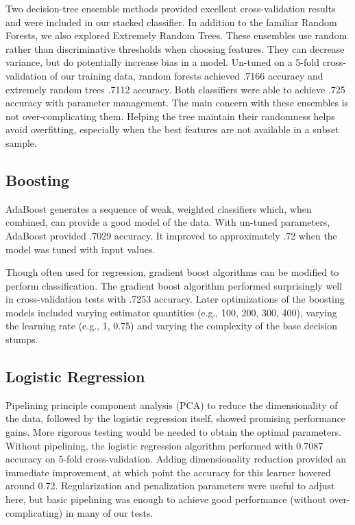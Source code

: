 \documentclass{article}
\begin{document}
Two decision-tree ensemble methods provided excellent cross-validation results and were included in our stacked classifier.
In addition to the familiar Random Forests, we also explored Extremely Random Trees.
These ensembles use random rather than discriminative thresholds when choosing features. 
They can decrease variance, but do potentially increase bias in a model.
Un-tuned on a 5-fold cross-validation of our training data, random forests achieved .7166 accuracy and extremely random trees .7112 accuracy.
Both classifiers were able to achieve .725 accuracy with parameter management. 
The main concern with these ensembles is not over-complicating them.
Helping the tree maintain their randomness helps avoid overfitting, especially when the best features are not available in a subset sample.

\subsection{Boosting}

AdaBoost generates a sequence of weak, weighted classifiers which, when combined, can provide a good model of the data.
With un-tuned parameters, AdaBoost provided .7029 accuracy. It improved to approximately .72 when the model was tuned with input values.

Though often used for regression, gradient boost algorithms can be modified to perform classification.
The gradient boost algorithm performed surprisingly well in cross-validation tests with .7253 accuracy.
Later optimizations of the boosting models included varying estimator quantities (e.g., 100, 200, 300, 400), varying the learning rate (e.g., 1, 0.75) and varying the complexity of the base decision stumps.

\subsection{Logistic Regression}

Pipelining principle component analysis (PCA) to reduce the dimensionality of the data, followed by the logistic regression itself, showed promising performance gains.
More rigorous testing would be needed to obtain the optimal parameters. 
Without pipelining, the logistic regression algorithm performed with 0.7087 accuracy on 5-fold cross-validation.
Adding dimensionality reduction provided an immediate improvement, at which point the accuracy for this learner hovered around 0.72.
Regularization and penalization parameters were useful to adjust here, but basic pipelining was enough to achieve good performance (without over-complicating) in many of our tests.
\end{document}

